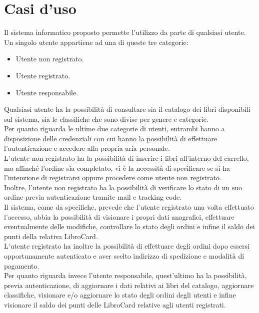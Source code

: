 \documentclass[a4paper,11pt]{report}
\begin{document}
\section{Casi d'uso}
Il sistema informatico proposto permette l'utilizzo da parte di qualsiasi utente.\\
Un singolo utente appartiene ad una di queste tre categorie: 

\begin{itemize}
	\item Utente non registrato.
	\item Utente registrato.
	\item Utente responsabile.
\end{itemize}

Qualsiasi utente ha la possibilità di consultare sia il catalogo dei libri disponibili sul sistema, sia le classifiche che sono divise per genere e categorie.\\
Per quanto riguarda le ultime due categorie di utenti, entrambi hanno a disposizione delle credenziali con cui hanno la possibilità di effettuare l'autenticazione e accedere alla propria aria personale.\\
\newline
L'utente non registrato ha la possibilità di inserire i libri all'interno del carrello, ma affinché l'ordine sia completato, vi è la necessità di specificare se si ha l'intenzione di registrarsi oppure procedere come utente non registrato.\\
Inoltre, l'utente non registrato ha la possibilità di verificare lo stato di un suo ordine previa autenticazione tramite mail e tracking code.\\
\newline
Il sistema, come da specifiche, prevede che l'utente registrato una volta effettuato l'accesso, abbia la possibilità di visionare i propri dati anagrafici, effettuare eventualmente delle modifiche, controllare lo stato degli ordini e infine il saldo dei punti della relativa LibroCard.\\ 
L'utente registrato ha inoltre la possibilità di effettuare degli ordini dopo essersi opportunamente autenticato e aver scelto indirizzo di spedizione e modalità di pagamento.\\
\newline
Per quanto riguarda invece l'utente responsabile, quest'ultimo ha la possibilità, previa autenticazione, di aggiornare i dati relativi ai libri del catalogo, aggiornare classifiche, visionare e/o aggiornare lo stato degli ordini degli utenti e infine visionare il saldo dei punti delle LibroCard relative agli utenti registrati.
\newline
\end{document}
